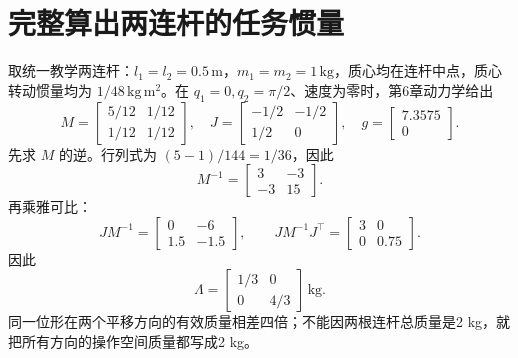\section{完整算出两连杆的任务惯量}

取统一教学两连杆：$l_1=l_2=0.5\,\mathrm{m}$，$m_1=m_2=1\,\mathrm{kg}$，质心均在连杆中点，质心转动惯量均为 $1/48\,\mathrm{kg\,m^2}$。在 $q_1=0,q_2=\pi/2$、速度为零时，第6章动力学给出
\[
M=\begin{bmatrix}5/12&1/12\\1/12&1/12\end{bmatrix},\quad
J=\begin{bmatrix}-1/2&-1/2\\1/2&0\end{bmatrix},\quad
 g=\begin{bmatrix}7.3575\\0\end{bmatrix}.
\]
先求 $M$ 的逆。行列式为 $(5-1)/144=1/36$，因此
\[
M^{-1}=\begin{bmatrix}3&-3\\-3&15\end{bmatrix}.
\]
再乘雅可比：
\[
JM^{-1}=\begin{bmatrix}0&-6\\1.5&-1.5\end{bmatrix},\qquad
JM^{-1}J^\top=\begin{bmatrix}3&0\\0&0.75\end{bmatrix}.
\]
因此
\begin{equation}
\Lambda=\begin{bmatrix}1/3&0\\0&4/3\end{bmatrix}\,\mathrm{kg}.
\end{equation}
同一位形在两个平移方向的有效质量相差四倍；不能因两根连杆总质量是2 kg，就把所有方向的操作空间质量都写成2 kg。


